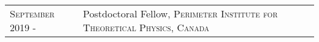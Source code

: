 \vspace*{-1.6cm}
\begin{longtable}{R{2.5cm}|p{14.8cm}}
 	\textsc{September 2019 - } & Postdoctoral Fellow, \textsc{Perimeter Institute for Theoretical Physics, Canada} \\
\end{longtable}
